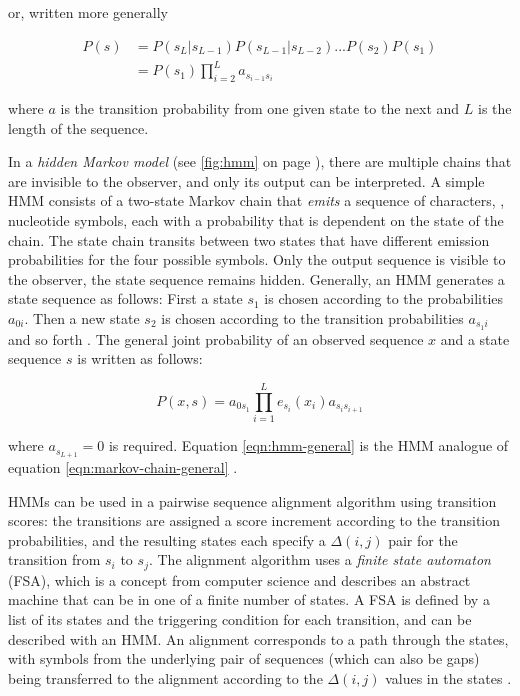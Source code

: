 or, written more generally

\begin{equation}
	\begin{split}
		P(s) &= P(s_L|s_{L-1}) P(s_{L-1}|s_{L-2}) . . . P(s_2) P(s_1) \\
		&= P(s_1) \prod^{L}_{i=2}a_{s_{i-1}s_{i}}
	\end{split}
	\label{eqn:markov-chain-general}
\end{equation}

where $a$ is the transition probability from one given state to the next and $L$
is the length of the sequence.

In a \emph{hidden Markov model} (see \autoref{fig:hmm} on page \pageref{fig:hmm}), there are multiple chains that are invisible to
the observer, and only its output can be interpreted. A simple HMM consists of a
two-state Markov chain that \emph{emits} a sequence of characters, \eg, nucleotide
symbols, each with a probability that is dependent on the state of the chain. The state chain
transits between two states that have different emission probabilities for the
four possible symbols. Only the output sequence is visible to the observer, the
state sequence remains hidden.
Generally, an HMM generates a state sequence as follows: First a state $s_1$ is
chosen according to the probabilities $a_{0i}$. Then a new state $s_2$ is
chosen according to the transition probabilities $a_{s_{1}i}$ and so forth
\citep{durbin1998}. The general joint probability of an observed sequence $x$
and a state sequence $s$ is written as follows:

\begin{equation}
P(x,s) = a_{0s_1} \prod_{i=1}^L e_{s_i}(x_i)a_{s_is_{i+1}}
\label{eqn:hmm-general}
\end{equation}

where $a_{s_{L+1}} = 0$ is required. Equation \eqref{eqn:hmm-general} is the HMM
analogue of equation \eqref{eqn:markov-chain-general} \citep{durbin1998}.



HMMs can be used in a pairwise sequence alignment algorithm using transition
scores: the transitions are assigned a score increment according to the
transition probabilities, and the resulting states each specify a $\Delta(i,j)$
pair for the transition from $s_i$ to $s_j$. The alignment algorithm uses a
\emph{finite state automaton} (FSA), which is a concept from computer science
and describes an abstract machine that can be in one of a finite number of
states. A FSA is defined by a list of its states and the triggering condition
for each transition, and can be described with an HMM. An alignment corresponds
to a path through the states, with symbols from the underlying pair of
sequences (which can also be gaps) being transferred to the alignment according
to the $\Delta(i,j)$ values in the states \citep{durbin1998}. 

